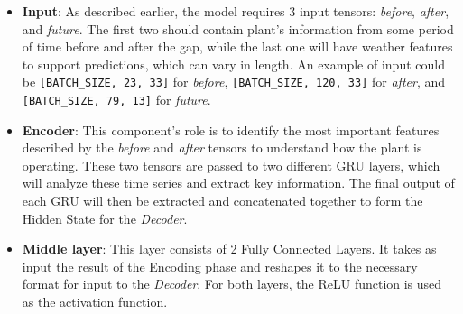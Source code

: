 \begin{itemize}
	\item \textbf{Input}: As described earlier, the model requires 3 input tensors: \textit{before}, \textit{after}, and \textit{future}. The first two should contain plant's information from some period of time before and after the gap, while the last one will have weather features to support predictions, which can vary in length. An example of input could be \verb|[BATCH_SIZE, 23, 33]| for \textit{before}, \verb|[BATCH_SIZE, 120, 33]| for \textit{after}, and \verb|[BATCH_SIZE, 79, 13]| for \textit{future}.

	\item \textbf{Encoder}: This component's role is to identify the most important features described by the \textit{before} and \textit{after} tensors to understand how the plant is operating. These two tensors are passed to two different GRU\cite{gru2} layers, which will analyze these time series and extract key information. The final output of each GRU will then be extracted and concatenated together to form the Hidden State for the \textit{Decoder}.

	\item \textbf{Middle layer}: This layer consists of 2 Fully Connected Layers. It takes as input the result of the Encoding phase and reshapes it to the necessary format for input to the \textit{Decoder}. For both layers, the ReLU\cite{functions} function is used as the activation function.


\end{itemize}

